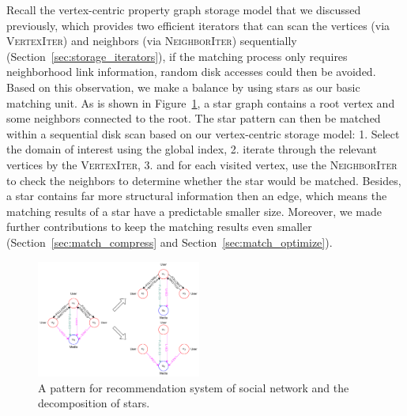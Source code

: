 Recall the vertex-centric property graph storage model that we discussed previously,
which provides two efficient iterators that can scan the vertices (via \textsc{VertexIter}) and neighbors (via \textsc{NeighborIter}) sequentially (Section~\ref{sec:storage_iterators}),
if the matching process only requires neighborhood link information,
random disk accesses could then be avoided.
Based on this observation, we make a balance by using stars as our basic matching unit.
As is shown in Figure~\ref{img:pattern_graph}, a star graph contains a root vertex and some neighbors connected to the root.
The star pattern can then be matched within a sequential disk scan based on our vertex-centric storage model:
1\@. Select the domain of interest using the global index,
2\@. iterate through the relevant vertices by the \textsc{VertexIter},
3\@. and for each visited vertex, use the \textsc{NeighborIter} to check the neighbors to determine whether the star would be matched.
Besides, a star contains far more structural information then an edge,
which means the matching results of a star have a predictable smaller size.
Moreover, we made further contributions to keep the matching results even smaller (Section~\ref{sec:match_compress} and Section~\ref{sec:match_optimize}).
\begin{figure}[ht]
  \centering
  \includegraphics[width=0.48\textwidth]{img/pattern_graph.pdf}
  \caption{A pattern for recommendation system of social network and the decomposition of stars.}\label{img:pattern_graph}
\end{figure}

